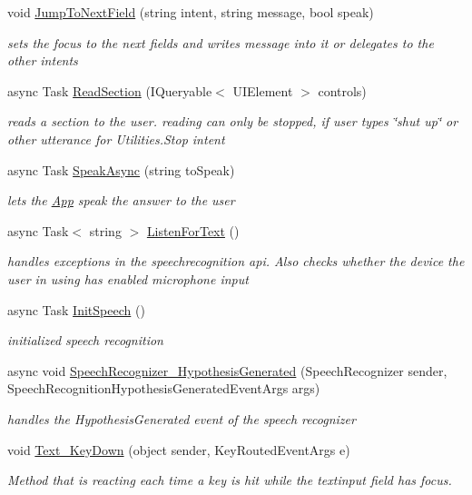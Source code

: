 \begin{DoxyCompactItemize}
void \mbox{\hyperlink{class_listen_to_me_1_1_main_page_aa87f869a3f59f800027481c98e4b906e}{Jump\+To\+Next\+Field}} (string intent, string message, bool speak)
\begin{DoxyCompactList}\small\item\em sets the focus to the next fields and writes message into it or delegates to the other intents \end{DoxyCompactList}\item 
async Task \mbox{\hyperlink{class_listen_to_me_1_1_main_page_ac18d07a7cf5452ea9fc8539764cc026d}{Read\+Section}} (I\+Queryable$<$ U\+I\+Element $>$ controls)
\begin{DoxyCompactList}\small\item\em reads a section to the user. reading can only be stopped, if user types \char`\"{}shut up\char`\"{} or other utterance for Utilities.\+Stop intent \end{DoxyCompactList}\item 
async Task \mbox{\hyperlink{class_listen_to_me_1_1_main_page_aa1c50f04230b8907027a95bfe54cb7d2}{Speak\+Async}} (string to\+Speak)
\begin{DoxyCompactList}\small\item\em lets the \mbox{\hyperlink{class_listen_to_me_1_1_app}{App}} speak the answer to the user \end{DoxyCompactList}\item 
async Task$<$ string $>$ \mbox{\hyperlink{class_listen_to_me_1_1_main_page_a94a7dfd5dc1ec2e9bf7a86a4b9f7df0c}{Listen\+For\+Text}} ()
\begin{DoxyCompactList}\small\item\em handles exceptions in the speechrecognition api. Also checks whether the device the user in using has enabled microphone input \end{DoxyCompactList}\item 
async Task \mbox{\hyperlink{class_listen_to_me_1_1_main_page_ac541bec23372af9da39117384c6b177e}{Init\+Speech}} ()
\begin{DoxyCompactList}\small\item\em initialized speech recognition \end{DoxyCompactList}\item 
async void \mbox{\hyperlink{class_listen_to_me_1_1_main_page_a78024cb9b68bafc3375081574dbbea89}{Speech\+Recognizer\+\_\+\+Hypothesis\+Generated}} (Speech\+Recognizer sender, Speech\+Recognition\+Hypothesis\+Generated\+Event\+Args args)
\begin{DoxyCompactList}\small\item\em handles the Hypothesis\+Generated event of the speech recognizer \end{DoxyCompactList}\item 
void \mbox{\hyperlink{class_listen_to_me_1_1_main_page_a1a90b99d968c5e20d291452daff8a0c3}{Text\+\_\+\+Key\+Down}} (object sender, Key\+Routed\+Event\+Args e)
\begin{DoxyCompactList}\small\item\em Method that is reacting each time a key is hit while the textinput field has focus. \end{DoxyCompactList}\end{DoxyCompactItemize}
